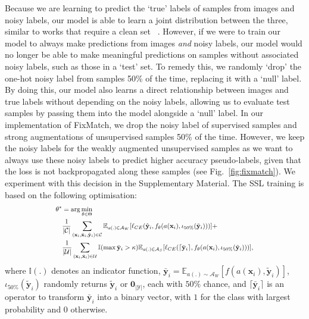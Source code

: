 \documentclass[10pt,twocolumn,letterpaper]{article}
\begin{document}
Because we are learning to predict the `true' labels of samples from images and noisy labels, our model is able to learn a joint distribution between the three, similar to works that require a clean set ~\cite{veit2017learning, inoue2017multi, gu2021instancedependent}. However, if we were to train our model to always make predictions from images \textit{and} noisy labels, our model would no longer be able to make meaningful predictions on samples without associated noisy labels, such as those in a `test' set. To remedy this, we randomly `drop' the one-hot noisy label from samples 50\% of the time, replacing it with a `null' label. By doing this, our model also learns a direct relationship between images and true labels without depending on the noisy labels, allowing us to evaluate test samples by passing them into the model alongside a `null' label. In our implementation of FixMatch, we drop the noisy label of supervised samples and strong augmentations of unsupervised samples 50\% of the time. However, we keep the noisy labels for the weakly augmented unsupervised samples as we want to always use these noisy labels to predict higher accuracy pseudo-labels, given that the loss is not backpropagated along these samples (see Fig.~\ref{fig:fixmatch}). We experiment with this decision in the Supplementary Material.
The SSL training is based on the following optimisation:
\begin{equation}
\scalebox{0.8}{$
\begin{aligned}
    \theta^{*} & = \arg\min_{\theta \in \Theta} \\
    &\frac{1}{|\mathcal{C}|} \sum_{(\mathbf{x}_i,\tilde{\mathbf{x}}_i,\hat{\mathbf{y}}_i)\in\mathcal{C}} \mathbb{E}_{a(.)\in\mathcal{A}_W}[ \ell_{CE}(\hat{\mathbf{y}}_i,f_{\theta}(a(\mathbf{x}_i),\iota_{50\%}(\tilde{\mathbf{y}}_i)))] + \\
    &\frac{1}{|\mathcal{U}|} \sum_{(\mathbf{x}_i,\tilde{\mathbf{x}}_i)\in\mathcal{U}}\mathbb{I}(\max \bar{\mathbf{y}}_i>\kappa)\mathbb{E}_{a(.)\in\mathcal{A}_S}[ \ell_{CE}(\lceil \bar{\mathbf{y}}_i \rceil,f_{\theta}(a(\mathbf{x}_i),\iota_{50\%}(\tilde{\mathbf{y}}_i))) ],
\end{aligned}
$}
\label{eq:SSL}
\end{equation}
where $\mathbb{I}(.)$ denotes an indicator function, $\bar{\mathbf{y}}_i = \mathbb{E}_{a(.) \sim \mathcal{A}_W}[f(a(\mathbf{x}_i),\tilde{\mathbf{y}}_i)]$, 
$\iota_{50\%}(\tilde{\mathbf{y}}_i)$ randomly returns $\tilde{\mathbf{y}}_i$ or $\mathbf{0}_{|\mathcal{Y}|}$, each with $50\%$ chance,
and 
$\lceil \bar{\mathbf{y}}_i \rceil$ is an operator to transform $\bar{\mathbf{y}}_i$ into a binary vector, with $1$ for the class with largest probability and $0$ otherwise.
\end{document}
